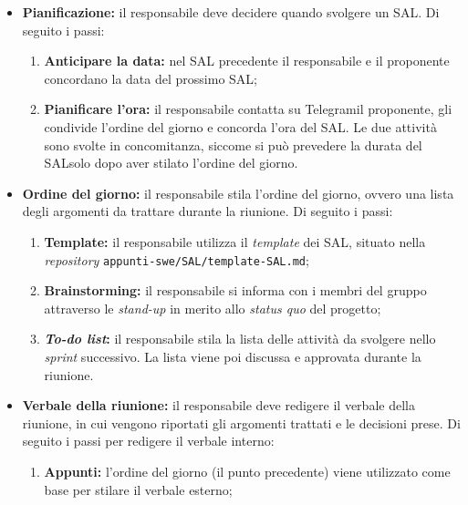 \begin{itemize}

	\item \textbf{Pianificazione:} il responsabile deve decidere quando svolgere
	      un SAL\g. Di seguito i passi:
	      \begin{enumerate}
		      \item \textbf{Anticipare la data:} nel SAL\g
		            precedente il responsabile e il proponente concordano
		            la data del prossimo SAL\g;

		      \item \textbf{Pianificare l'ora:} il responsabile contatta su
		            Telegram\g il proponente, gli condivide l'ordine del
		            giorno e concorda l'ora del SAL\g. Le due attività
		            sono svolte in concomitanza, siccome si può prevedere la
		            durata del SAL\g solo dopo aver stilato l'ordine del
		            giorno.
	      \end{enumerate}

	\item \textbf{Ordine del giorno:} il responsabile stila l'ordine del
	      giorno, ovvero una lista degli argomenti da trattare durante la
	      riunione. Di seguito i passi:
	      \begin{enumerate}
		      \item \textbf{Template:} il responsabile utilizza il \textit{template}
		            dei SAL\g, situato nella \textit{repository\g}
		            \texttt{appunti-swe/SAL/template-SAL.md};

		      \item \textbf{Brainstorming:} il responsabile si informa con i
		            membri del gruppo attraverso le \textit{stand-up} in merito
		            allo \textit{status quo} del progetto;

		      \item \textbf{\textit{To-do list}:} il responsabile stila la lista
		            delle attività da svolgere nello \textit{sprint} successivo. La
		            lista viene poi discussa e approvata durante la riunione.
	      \end{enumerate}

	\item \textbf{Verbale della riunione:} il responsabile deve redigere il
	      verbale della riunione, in cui vengono riportati gli argomenti
	      trattati e le decisioni prese. Di seguito i passi per redigere il
	      verbale interno:
	      \begin{enumerate}
		      \item \textbf{Appunti:} l'ordine del giorno (il punto precedente)
		            viene utilizzato come base per stilare il verbale esterno;


\end{enumerate}
\end{itemize}
